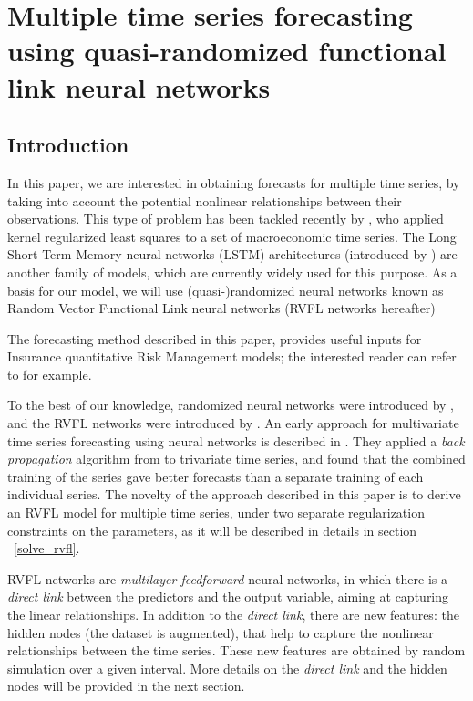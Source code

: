 %
\chapter{Multiple time series forecasting using quasi-randomized functional link neural networks}
\label{sec:rvfl_mts}

\section{Introduction}

In this paper, we are interested in obtaining forecasts for multiple time series, by taking into account the potential nonlinear relationships between their observations. This type of problem has been tackled recently by \cite{exterkate2016nonlinear}, who applied kernel regularized least squares to a set of macroeconomic time series. The Long Short-Term Memory neural networks (LSTM) architectures (introduced by \cite{hochreiter1997long}) are another family of models, which are currently widely used for this purpose. As a basis for our model, we will use (quasi-)randomized neural networks known as Random Vector Functional Link neural networks (RVFL networks hereafter)

\medskip

The forecasting method described in this paper, provides useful inputs for Insurance quantitative Risk Management models; the interested reader can refer to \cite{bonnin2015retraite} for example.

\medskip

To the best of our knowledge, randomized neural networks were introduced by \cite{schmidt1992feedforward}, and the RVFL networks were introduced by \cite{pao1994learning}. An early approach for multivariate time series forecasting using neural networks is described in \cite{chakraborty1992forecasting}. They applied a \textit{back propagation} algorithm from \cite{rumelhart1988learning} to trivariate time series, and found that the combined training of the series gave better forecasts than a separate training of each individual series. The novelty of the approach described in this paper is to derive an RVFL model for multiple time series, under two separate regularization constraints on the parameters, as it will be described in details in  section ~\ref{solve_rvfl}.

\medskip

RVFL networks are \textit{multilayer feedforward} neural networks, in which there is a \textit{direct link} between the predictors and the output variable, aiming at capturing the linear relationships. In addition to the \textit{direct link}, there are new features: the hidden nodes (the dataset is augmented), that help to capture the nonlinear relationships between the time series. These new features are obtained by random simulation over a given interval. More details on the \textit{direct link} and the hidden nodes will be provided in the next section.

